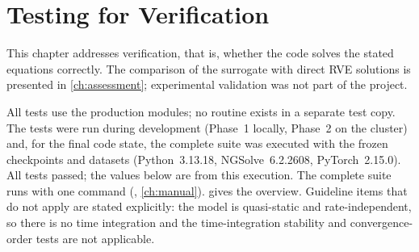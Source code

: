 \chapter{Testing for Verification}\label{ch:verification}

This chapter addresses verification, that is, whether the code solves the stated
equations correctly. The comparison of the surrogate with direct RVE solutions is
presented in \cref{ch:assessment}; experimental validation was not part of the
project.

All tests use the production modules; no routine exists in a separate test copy.
The tests were run during development (Phase~1 locally, Phase~2 on the cluster)
and, for the final code state, the complete suite was executed with the frozen
checkpoints and datasets (Python~3.13.18, NGSolve~6.2.2608, PyTorch~2.15.0). All
tests passed; the values below are from this execution. The complete suite runs with one command
(, \cref{ch:manual}).  gives the overview. Guideline items that do not
apply are stated explicitly: the model is quasi-static and rate-independent, so
there is no time integration and the time-integration stability and
convergence-order tests are not applicable.

